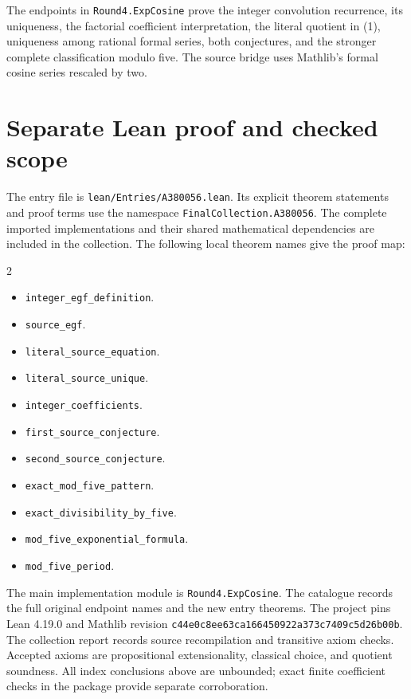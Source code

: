 \documentclass[11pt,a4paper]{article}
\theoremstyle{remark}
\begin{document}
The endpoints in \texttt{Round4.ExpCosine} prove the integer convolution
recurrence, its uniqueness, the factorial coefficient interpretation,
the literal quotient in (1), uniqueness among rational formal series,
both conjectures, and the stronger complete classification modulo five.
The source bridge uses Mathlib's formal cosine series rescaled by two.


\section{Separate Lean proof and checked scope}

The entry file is \nolinkurl{lean/Entries/A380056.lean}. Its explicit
theorem statements and proof terms use the namespace
\nolinkurl{FinalCollection.A380056}. The complete imported implementations
and their shared mathematical dependencies are included in the collection.
The following local theorem names give the proof map:

\begin{multicols}{2}\raggedright\begin{itemize}\setlength{\itemsep}{2pt}\setlength{\parsep}{0pt}
\item \nolinkurl{integer_egf_definition}.
\item \nolinkurl{source_egf}.
\item \nolinkurl{literal_source_equation}.
\item \nolinkurl{literal_source_unique}.
\item \nolinkurl{integer_coefficients}.
\item \nolinkurl{first_source_conjecture}.
\item \nolinkurl{second_source_conjecture}.
\item \nolinkurl{exact_mod_five_pattern}.
\item \nolinkurl{exact_divisibility_by_five}.
\item \nolinkurl{mod_five_exponential_formula}.
\item \nolinkurl{mod_five_period}.
\end{itemize}\end{multicols}

The main implementation module is \nolinkurl{Round4.ExpCosine}.
The catalogue records the full original endpoint names and the new entry
theorems. The project pins Lean 4.19.0 and Mathlib revision
\nolinkurl{c44e0c8ee63ca166450922a373c7409c5d26b00b}. The collection
report records source recompilation and transitive axiom checks. Accepted
axioms are propositional extensionality, classical choice, and quotient
soundness. All index conclusions above are unbounded; exact finite
coefficient checks in the package provide separate corroboration.
\end{document}
